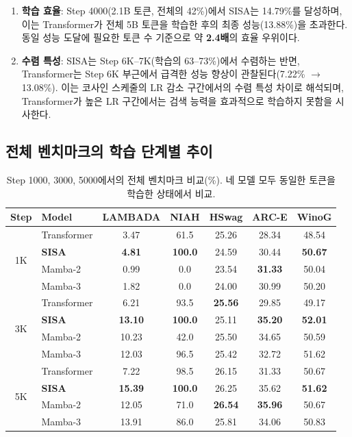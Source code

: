 \documentclass[11pt]{article}
\begin{document}
\begin{enumerate}[leftmargin=*]
\item \textbf{학습 효율}: Step 4000(2.1B 토큰, 전체의 42\%)에서 SISA는 14.79\%를 달성하며, 이는 Transformer가 전체 5B 토큰을 학습한 후의 최종 성능(13.88\%)을 초과한다. 동일 성능 도달에 필요한 토큰 수 기준으로 약 \textbf{2.4배}의 효율 우위이다.

\item \textbf{수렴 특성}: SISA는 Step 6K--7K(학습의 63--73\%)에서 수렴하는 반면, Transformer는 Step 6K 부근에서 급격한 성능 향상이 관찰된다(7.22\% $\to$ 13.08\%). 이는 코사인 스케줄의 LR 감소 구간에서의 수렴 특성 차이로 해석되며, Transformer가 높은 LR 구간에서는 검색 능력을 효과적으로 학습하지 못함을 시사한다.
\end{enumerate}

\subsection{전체 벤치마크의 학습 단계별 추이}

\begin{table}[h]
\centering
\small
\caption{Step 1000, 3000, 5000에서의 전체 벤치마크 비교(\%). 네 모델 모두 동일한 토큰을 학습한 상태에서 비교.}
\label{tab:step_comparison}
\begin{tabular}{clccccc}
\toprule
\textbf{Step} & \textbf{Model} & \textbf{LAMBADA} & \textbf{NIAH} & \textbf{HSwag} & \textbf{ARC-E} & \textbf{WinoG} \\
\midrule
\multirow{4}{*}{1K} & Transformer & 3.47 & 61.5 & 25.26 & 28.34 & 48.54 \\
& \textbf{SISA} & \textbf{4.81} & \textbf{100.0} & 24.59 & 30.44 & \textbf{50.67} \\
& Mamba-2 & 0.99 & 0.0 & 23.54 & \textbf{31.33} & 50.04 \\
& Mamba-3 & 1.82 & 0.0 & 24.00 & 30.99 & 50.20 \\
\midrule
\multirow{4}{*}{3K} & Transformer & 6.21 & 93.5 & \textbf{25.56} & 29.85 & 49.17 \\
& \textbf{SISA} & \textbf{13.10} & \textbf{100.0} & 25.11 & \textbf{35.20} & \textbf{52.01} \\
& Mamba-2 & 10.23 & 42.0 & 25.50 & 34.65 & 50.59 \\
& Mamba-3 & 12.03 & 96.5 & 25.42 & 32.72 & 51.62 \\
\midrule
\multirow{4}{*}{5K} & Transformer & 7.22 & 98.5 & 26.15 & 31.33 & 50.67 \\
& \textbf{SISA} & \textbf{15.39} & \textbf{100.0} & 26.25 & 35.62 & \textbf{51.62} \\
& Mamba-2 & 12.05 & 71.0 & \textbf{26.54} & \textbf{35.96} & 50.67 \\
& Mamba-3 & 13.91 & 86.0 & 25.81 & 34.06 & 50.83 \\
\bottomrule
\end{tabular}
\end{table}
\end{document}
